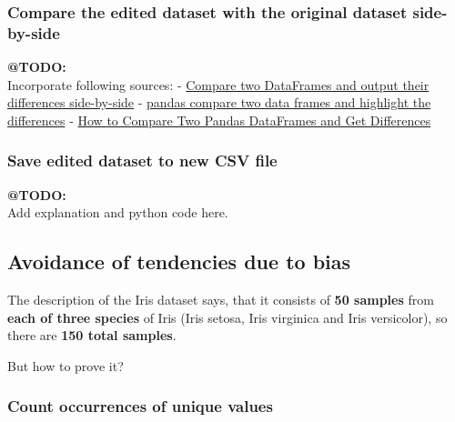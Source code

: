 \documentclass [oneside,10pt,a4paper,ngerman,BCOR10mm,headsepline,parindent,final]{scrartcl}
\begin{document}
    \hypertarget{compare-the-edited-dataset-with-the-original-dataset-side-by-side}{%
\subsubsection{Compare the edited dataset with the original dataset
side-by-side}\label{compare-the-edited-dataset-with-the-original-dataset-side-by-side}}

\textbf{@TODO:}\\
Incorporate following sources: -
\href{https://stackoverflow.com/questions/17095101/compare-two-dataframes-and-output-their-differences-side-by-side/47112033\#47112033}{Compare
two DataFrames and output their differences side-by-side} -
\href{https://stackoverflow.com/questions/71604701/pandas-compare-two-data-frames-and-highlight-the-differences/71617662\#71617662}{pandas
compare two data frames and highlight the differences} -
\href{https://datascientyst.com/compare-two-pandas-dataframes-get-differences/}{How
to Compare Two Pandas DataFrames and Get Differences}

    \hypertarget{save-edited-dataset-to-new-csv-file}{%
\subsubsection{Save edited dataset to new CSV
file}\label{save-edited-dataset-to-new-csv-file}}

\textbf{@TODO:}\\
Add explanation and python code here.

    \hypertarget{avoidance-of-tendencies-due-to-bias}{%
\subsection{\texorpdfstring{Avoidance of \textbf{tendencies due to
bias}}{Avoidance of tendencies due to bias}}\label{avoidance-of-tendencies-due-to-bias}}

The description of the Iris dataset says, that it consists of \textbf{50
samples} from \textbf{each of three species} of Iris (Iris setosa, Iris
virginica and Iris versicolor), so there are \textbf{150 total samples}.

But how to prove it?

\hypertarget{count-occurrences-of-unique-values}{%
\subsubsection{Count occurrences of unique
values}\label{count-occurrences-of-unique-values}}
\end{document}
